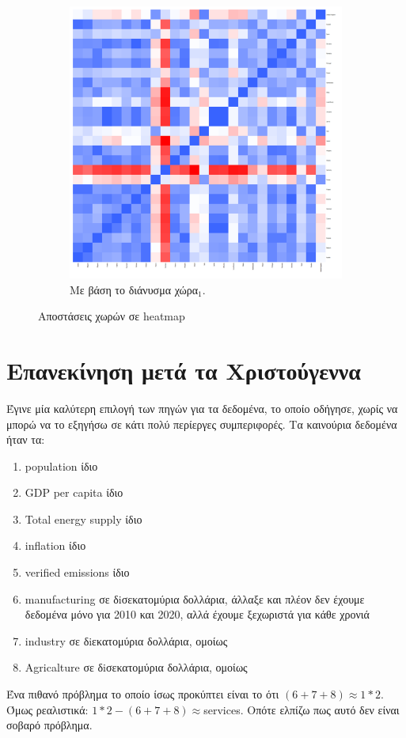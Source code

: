 \documentclass[a4paper,twoside,10pt]{article}
\begin{document}
\begin{figure}[H]
\begin{subfigure}[b]{0.3\textwidth}
			\includegraphics[width=\textwidth]{images/heatmap_distances_of_2015.png}
			\caption{Με βάση το διάνυσμα χώρα$_1$.}
			\label{fig:five over x}
		\end{subfigure}
		\caption{Αποστάσεις χωρών σε heatmap}
		\label{fig:three graphs}
	\end{figure}
	\section{Επανεκίνηση μετά τα Χριστούγεννα}
	Έγινε μία καλύτερη επιλογή των πηγών για τα δεδομένα, το οποίο οδήγησε, χωρίς να μπορώ να το εξηγήσω σε κάτι πολύ περίεργες συμπεριφορές.
	Τα καινούρια δεδομένα ήταν τα:
	\begin{enumerate}
		\item population ίδιο
		\item GDP per capita ίδιο
		\item Total energy supply ίδιο
		\item inflation ίδιο
		\item verified emissions ίδιο
		\item manufacturing σε δiσεκατομύρια δολλάρια, άλλαξε και πλέον δεν έχουμε δεδομένα μόνο για 2010 και 2020, αλλά έχουμε ξεχωριστά για κάθε χρονιά
		\item industry σε δiεκατομύρια δολλάρια, ομοίως
		\item Agricalture σε δiσεκατομύρια δολλάρια, ομοίως
	\end{enumerate}
	Ένα πιθανό πρόβλημα το οποίο ίσως προκύπτει είναι το ότι $(6+7+8) \approx 1*2$. Όμως ρεαλιστικά: $1*2 - (6+7+8) \approx $services. Οπότε ελπίζω πως αυτό δεν είναι σοβαρό πρόβλημα. 
	
\end{document}
